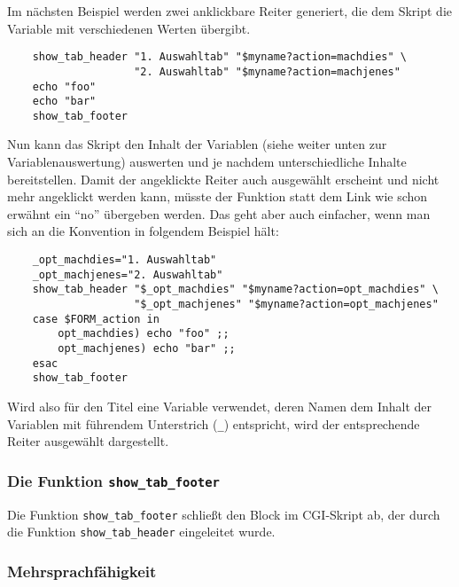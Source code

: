 Im nächsten Beispiel werden zwei anklickbare Reiter generiert, die dem
Skript die Variable  mit verschiedenen Werten übergibt.

\begin{example}
\begin{verbatim}
    show_tab_header "1. Auswahltab" "$myname?action=machdies" \
                    "2. Auswahltab" "$myname?action=machjenes"
    echo "foo"
    echo "bar"
    show_tab_footer
\end{verbatim}
\end{example}

Nun kann das Skript den Inhalt der Variablen  (siehe weiter
unten zur Variablenauswertung) auswerten und je nachdem unterschiedliche Inhalte
bereitstellen. Damit der angeklickte Reiter auch ausgewählt erscheint und nicht
mehr angeklickt werden kann, müsste der Funktion statt dem Link wie schon
erwähnt ein "`no"' übergeben werden. Das geht aber auch einfacher, wenn man sich
an die Konvention in folgendem Beispiel hält:

\begin{example}
\begin{verbatim}
    _opt_machdies="1. Auswahltab"
    _opt_machjenes="2. Auswahltab"
    show_tab_header "$_opt_machdies" "$myname?action=opt_machdies" \
                    "$_opt_machjenes" "$myname?action=opt_machjenes"
    case $FORM_action in
        opt_machdies) echo "foo" ;;
        opt_machjenes) echo "bar" ;;
    esac
    show_tab_footer
\end{verbatim}
\end{example}

Wird also für den Titel eine Variable verwendet, deren Namen dem Inhalt der
Variablen  mit führendem Unterstrich (\texttt{\_}) entspricht, wird
der entsprechende Reiter ausgewählt dargestellt.

\subsubsection{Die Funktion \texttt{show\_tab\_footer}}

Die Funktion \texttt{show\_tab\_footer} schließt den Block im CGI-Skript ab,
der durch die Funktion \texttt{show\_tab\_header} eingeleitet wurde.

\subsubsection{Mehrsprachfähigkeit}

